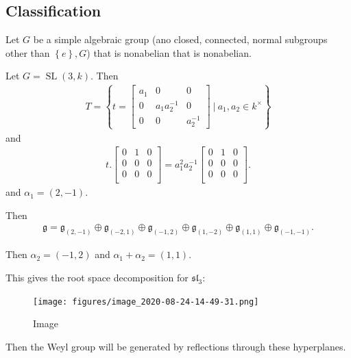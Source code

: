 \hypertarget{classification}{%
\subsection{Classification}\label{classification}}

Let \(G\) be a simple algebraic group (ano closed, connected, normal
subgroups other than \(\left\{{e}\right\}, G\)) that is nonabelian that
is nonabelian.

\begin{example}

Let \(G = {\operatorname{SL}}(3, k)\). Then
\begin{align*}  
T = \left\{{
t = 
\begin{bmatrix}
a_1 & 0 & 0 \\
0 & a_1 a_2^{-1}  & 0\\
0 & 0 & a_2^{-1} 
\end{bmatrix}
{~\mathrel{\Big|}~}
a_1, a_2\in k^{\times}
}\right\}
\end{align*}
and
\begin{align*}  
t.
\begin{bmatrix}
0 & 1 & 0 \\
0 & 0 & 0 \\
0 & 0 & 0 \\
\end{bmatrix}
= 
a_1^2 a_2^{-1} 
\begin{bmatrix}
0 & 1 & 0 \\
0 & 0 & 0 \\
0 & 0 & 0 \\
\end{bmatrix}
.\end{align*}
and \(\alpha_1 = (2, -1)\).


Then
\begin{align*}  
{\mathfrak{g}}= 
{\mathfrak{g}}_{(2, -1)} \oplus {\mathfrak{g}}_{(-2, 1)} \oplus
{\mathfrak{g}}_{(-1, 2)} \oplus {\mathfrak{g}}_{(1, -2)} \oplus
{\mathfrak{g}}_{(1, 1)} \oplus {\mathfrak{g}}_{(-1, -1)}
.\end{align*}

Then \(\alpha_2 = (-1, 2)\) and \(\alpha_1 + \alpha_2 = ( 1, 1)\).

This gives the root space decomposition for \({\mathfrak{sl}}_3\):

\begin{figure}
\centering
\texttt{[image: figures/image\_2020-08-24-14-49-31.png]}
\caption{Image}
\end{figure}

Then the Weyl group will be generated by reflections through these
hyperplanes.

\end{example}

